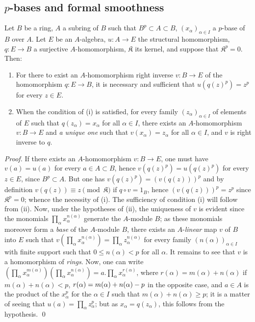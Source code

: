 \subsection{\texorpdfstring{$p$}{p}-bases and formal smoothness}
\label{subsection:0.21.2}

\begin{theorem}[21.2.1]
\label{0.21.2.1}
Let $B$ be a ring, $A$ a subring of $B$ such that $B^p\subset A\subset B$, $(x_\alpha)_{\alpha\in I}$ a $p$-base of $B$ over $A$.
Let $E$ be an $A$-algebra, $u:A\to E$ the structural homomorphism, $q:E\to B$ a surjective $A$-homomorphism, $\mathfrak K$ its kernel, and suppose that $\mathfrak K^p=0$.
Then:
\begin{enumerate}
  \item[\rm(i)] For there to exist an $A$-homomorphism right inverse $v:B\to E$ of the homomorphism $q:E\to B$, it is necessary and sufficient that $u(q(z)^p)=z^p$ for every $z\in E$.
  \item[\rm(ii)] When the condition of \textup{(i)} is satisfied, for every family $(z_\alpha)_{\alpha\in I}$ of elements of $E$ such that $q(z_\alpha)=x_\alpha$ for all $\alpha\in I$, there exists an $A$-homomorphism $v:B\to E$ and \emph{a unique one} such that $v(x_\alpha)=z_\alpha$ for all $\alpha\in I$, and $v$ is right inverse to $q$.
\end{enumerate}
\end{theorem}

\begin{proof}
If there exists an $A$-homomorphism $v:B\to E$, one must have $v(a)=u(a)$ for every $a\in A\subset B$, hence $v(q(z)^p)=u(q(z)^p)$ for every $z\in E$, since $B^p\subset A$.
But one has $v(q(z)^p)=(v(q(z)))^p$ and by definition $v(q(z))\equiv z\pmod{\mathfrak K}$ if $q\circ v=1_B$, hence $(v(q(z)))^p=z^p$ since $\mathfrak K^p=0$; whence the necessity of (i).
The sufficiency of condition (i) will follow from (ii).
Now, under the hypotheses of (ii), the uniqueness of $v$ is evident since the monomials $\prod_\alpha x_\alpha^{n(\alpha)}$ generate the $A$-module $B$; as these monomials moreover form a \emph{base} of the $A$-module $B$, there exists an $A$-\emph{linear} map $v$ of $B$ into $E$ such that $v\left(\prod_\alpha x_\alpha^{n(\alpha)}\right)=\prod_\alpha z_\alpha^{n(\alpha)}$ for every family $(n(\alpha))_{\alpha\in I}$ with finite support such that $0\leq n(\alpha)<p$ for all $\alpha$.
It remains to see that $v$ is a homomorphism of \emph{rings}.
Now, one can write $\left(\prod_\alpha x_\alpha^{m(\alpha)}\right)\left(\prod_\alpha x_\alpha^{n(\alpha)}\right)=a.\prod_\alpha x_\alpha^{r(\alpha)}$, where $r(\alpha)=m(\alpha)+n(\alpha)$ if $m(\alpha)+n(\alpha)<p$, $r(\alpha)=m(\alpha)+n(\alpha)- p$ in the opposite case, and $a\in A$
is the product of the $x_\alpha^p$ for the $\alpha\in I$ such that $m(\alpha)+n(\alpha)\geq p$; it is a matter of seeing that $u(a)=\prod_\alpha z_\alpha^p$; but as $x_\alpha=q(z_\alpha)$, this follows from the hypothesis.
\qed
\end{proof}

